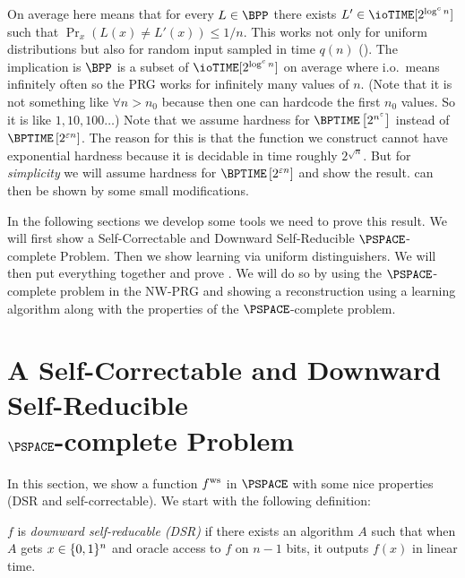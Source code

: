 On average here means that for every $L \in \BPP$ there exists $L' \in \ioTIME[2^{\log^c n}]$ such that $\Pr_x(L(x) \neq L'(x)) \leq 1/n$. This works not only for uniform distributions but also for random input sampled in time $q(n)$ ().
The implication is $\BPP$ is a subset of $\ioTIME[2^{\log^c n}]$ on average where i.o.\ means infinitely often so the PRG works for infinitely many values of $n$. (Note that it is not something like $\forall n > n_0$ because then one can hardcode the first $n_0$ values. So it is like $1,10,100 \ldots$)
Note that we assume hardness for $\BPTIME\left[2^{n^\eps}\right]$ instead of $\BPTIME\left[2^{\eps n}\right]$. The reason for this is that the function we construct cannot have exponential hardness because it is decidable in time roughly $2^{\sqrt{n}}$. But for \emph{simplicity} we will assume hardness for $\BPTIME\left[2^{\eps n}\right]$ and show the result.  can then be shown by some small modifications.

In the following sections we develop some tools we need to prove this result. We will first show a Self-Correctable and Downward Self-Reducible $\PSPACE$-complete Problem. Then we show learning via uniform distinguishers. We will then put everything together and prove . We will do so by using the $\PSPACE$-complete problem in the NW-PRG and showing a reconstruction using a learning algorithm along with the properties of the $\PSPACE$-complete problem.

\section[A Self-Correctable and Downward Self-Reducible \texorpdfstring{$\PSPACE$}{PSPACE}-complete Problem]
{A Self-Correctable and Downward Self-Reducible \\ \texorpdfstring{$\PSPACE$}{PSPACE}-complete Problem}

In this section, we show a function $ f^{\text{ws}} $ in $\PSPACE$ with some nice properties (DSR and self-correctable). We start with the following definition:
\begin{definition}
	$f$ is \emph{downward self-reducable (DSR)} if there exists an algorithm $A$
	such that when $A$ gets $x \in \{0, 1\}^n$ and oracle access to $f$ on $n -
	1$ bits, it outputs $f(x)$ in linear time.
\end{definition}

